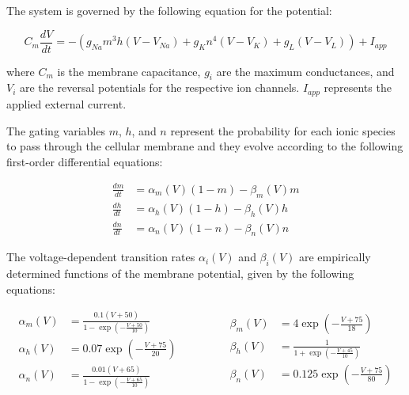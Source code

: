 The system is governed by the following equation for the potential:

\begin{equation}
    C_{m}\frac{dV}{dt} = -(g_{Na}m^{3}h(V-V_{Na}) + g_{K}n^{4}(V-V_{K}) + g_{L}(V-V_{L})) + I_{app}
    \label{eq:HH_voltage}
\end{equation}

where $C_m$ is the membrane capacitance, $g_i$ are the maximum conductances, and $V_i$ are the reversal potentials for the respective ion channels. $I_{app}$ represents the applied external current.

The gating variables $m$, $h$, and $n$ represent the probability for each ionic species to pass through the cellular membrane and they evolve according to the following first-order differential equations:

\begin{equation}
    \begin{aligned}
        \frac{dm}{dt} &= \alpha_{m}(V)(1-m) - \beta_{m}(V)m \\
        \frac{dh}{dt} &= \alpha_{h}(V)(1-h) - \beta_{h}(V)h \\
        \frac{dn}{dt} &= \alpha_{n}(V)(1-n) - \beta_{n}(V)n
    \end{aligned}
    \label{eq:HH_gating}
\end{equation}


The voltage-dependent transition rates $\alpha_i(V)$ and $\beta_i(V)$ are empirically determined functions of the membrane potential, given by the following equations:

\begin{equation}
    \begin{aligned}
        \alpha_{m}(V) &= \frac{0.1(V+50)}{1 - \exp\left(-\frac{V+50}{10}\right)} \\[2ex]
        \alpha_{h}(V) &= 0.07 \exp\left(-\frac{V+75}{20}\right) \\[2ex]
        \alpha_{n}(V) &= \frac{0.01(V+65)}{1 - \exp\left(-\frac{V+65}{10}\right)}
    \end{aligned}
    \qquad\qquad
    \begin{aligned}
        \beta_{m}(V) &= 4 \exp\left(-\frac{V+75}{18}\right) \\[2ex]
        \beta_{h}(V) &= \frac{1}{1 + \exp\left(-\frac{V+45}{10}\right)} \\[2ex]
        \beta_{n}(V) &= 0.125 \exp\left(-\frac{V+75}{80}\right)
    \end{aligned}
    \label{eq:HH_rates}
\end{equation}

